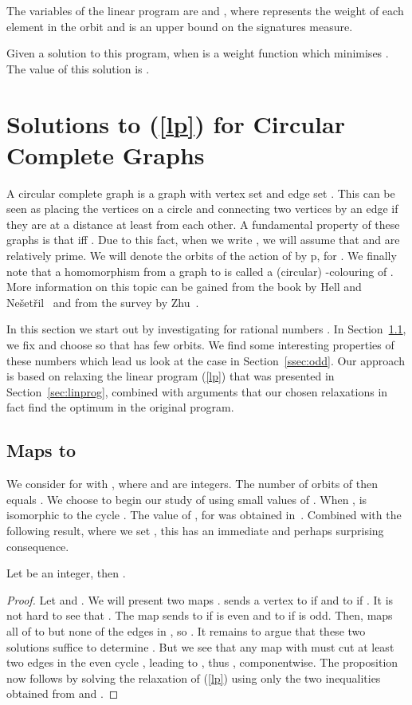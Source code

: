 \documentclass[11pt,a4paper]{article}
\begin{document}
The variables of the linear program are  and
, where  represents the weight of each element in the orbit
 and  is an upper bound on the signatures measure.

Given a solution  to this program, 
when  is a weight function which minimises .
The value of this solution is . 






\section{Solutions to (\ref{lp}) for Circular Complete Graphs} \label{sec:meas}

A circular complete graph  is a graph with vertex set
 and edge set . This can be seen as placing the vertices on a circle and
connecting two vertices by an edge if they are at a distance at least
 from each other. A fundamental property of these graphs is that
 iff .
Due to this fact, when we write , we will assume that  and 
are relatively prime.
We will denote the orbits of the action of  by
p,
for .
We finally note that a
homomorphism from a graph  to  is called a (circular)
-colouring of . 
More information on this topic can be gained
from the book by Hell and Ne\v{s}et\v{r}il~\cite{HN04} and from the
survey by Zhu~\cite{zhu:survey}.

In this section we start out by investigating 
for rational numbers .
In Section~\ref{ssec:k2}, we fix  and choose  so that
 has few orbits.
We find some interesting properties of these numbers which lead
us look at the case  in Section~\ref{ssec:odd}.
Our approach is based on relaxing the linear program (\ref{lp})
that was presented in Section~\ref{sec:linprog}, combined with
arguments that our chosen relaxations in fact find the optimum
in the original program.


\subsection{Maps to } \label{ssec:k2}

We consider  for
 with , where  and  are integers.
The number of orbits of  then equals .
We choose to begin our study of  using small values of .
When ,  is isomorphic to the cycle .
The value of , for  
was obtained in~\cite{farnqvist:etal:09}.
Combined with the following result, where we set , 
this has an immediate and perhaps surprising consequence.
\begin{proposition}
\label{prop:4k+4}
Let  be an integer, then .
\end{proposition}
\begin{proof}
Let  and .
We will present two maps .
 sends a vertex  to  if  and to  if
.
It is not hard to see that .
The map  sends  to  if  is even and to  if  is odd.
Then,  maps all of  to  but none of the edges in ,
so .
It remains to argue that these two solutions suffice to determine .
But we see that any map  with  must cut at least two edges in
the even cycle , leading to , thus ,
componentwise.
The proposition now follows by solving the relaxation of (\ref{lp})
using only the two inequalities obtained from  and .
\end{proof}
\end{document}
